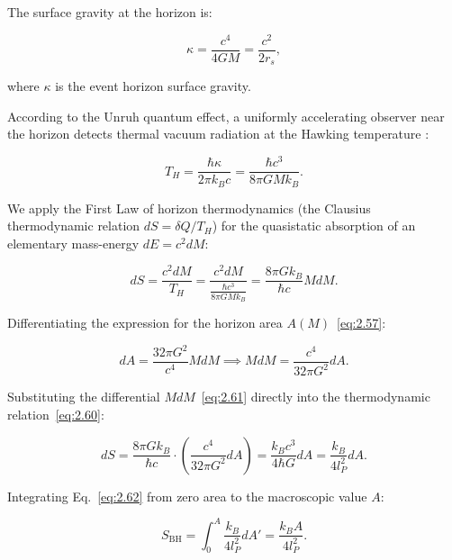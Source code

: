 The surface gravity at the horizon is:

\begin{equation}\label{eq:2.58}\label{eq:2.109}\tag{2.58}
\kappa = \frac{c^4}{4GM} = \frac{c^2}{2 r_s},
\end{equation}

where $\kappa$ is the event horizon surface gravity.

According to the Unruh quantum effect, a uniformly accelerating observer near the horizon detects thermal vacuum radiation at the Hawking temperature \cite{ref18}:

\begin{equation}\label{eq:2.59}\label{eq:2.110}\tag{2.59}
T_H = \frac{\hbar \kappa}{2\pi k_B c} = \frac{\hbar c^3}{8\pi G M k_B}.
\end{equation}

We apply the First Law of horizon thermodynamics (the Clausius thermodynamic relation $dS = \delta Q / T_H$) for the quasistatic absorption of an elementary mass-energy $dE = c^2 dM$:

\begin{equation}\label{eq:2.60}\label{eq:2.111}\tag{2.60}
dS = \frac{c^2 dM}{T_H} = \frac{c^2 dM}{\frac{\hbar c^3}{8\pi G M k_B}} = \frac{8\pi G k_B}{\hbar c} M dM.
\end{equation}

Differentiating the expression for the horizon area $A(M)$~\eqref{eq:2.57}:

\begin{equation}\label{eq:2.61}\label{eq:2.112}\tag{2.61}
dA = \frac{32\pi G^2}{c^4} M dM \implies M dM = \frac{c^4}{32\pi G^2} dA.
\end{equation}

Substituting the differential $M dM$~\eqref{eq:2.61} directly into the thermodynamic relation~\eqref{eq:2.60}:

\begin{equation}\label{eq:2.62}\label{eq:2.113}\tag{2.62}
dS = \frac{8\pi G k_B}{\hbar c} \cdot \left( \frac{c^4}{32\pi G^2} dA \right) = \frac{k_B c^3}{4 \hbar G} dA = \frac{k_B}{4 l_P^2} dA.
\end{equation}

Integrating Eq.~\eqref{eq:2.62} from zero area to the macroscopic value $A$:

\begin{equation}\label{eq:2.63}\label{eq:2.114}\tag{2.63}
S_{\text{BH}} = \int_0^A \frac{k_B}{4 l_P^2} dA' = \frac{k_B A}{4 l_P^2}.
\end{equation}

